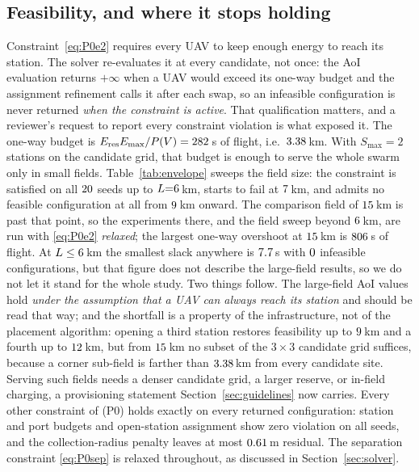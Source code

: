 \subsection{Feasibility, and where it stops holding}
\label{sec:feasible}
\label{sec:reach}

Constraint~\eqref{eq:P0e2} requires every UAV to keep enough energy to reach its
station. The solver re-evaluates it at every candidate, not once: the AoI evaluation
returns $+\infty$ when a UAV would exceed its one-way budget and the assignment
refinement calls it after each swap, so an infeasible configuration is never returned
\emph{when the constraint is active}. That qualification matters, and a reviewer's
request to report every constraint violation is what exposed it. The one-way budget is
$E_{\mathrm{res}}E_{\max}/P(V)=282$\,s of flight, i.e.\ $3.38$\,km. With
$S_{\max}{=}2$ stations on the candidate grid, that budget is enough to serve the whole
swarm only in small fields. Table~\ref{tab:envelope} sweeps the field size: the
constraint is satisfied on all $20$ seeds up to $L{=}6$\,km, starts
to fail at $7$\,km, and admits no feasible configuration at all from
$9$\,km onward. The comparison field of $15$\,km is past that point,
so the experiments there, and the field sweep beyond
$6$\,km, are run with \eqref{eq:P0e2} \emph{relaxed}; the largest one-way
overshoot at $15$\,km is $806$\,s of flight. At $L\le6$\,km the smallest slack anywhere is $7.7$\,s with
$0$ infeasible configurations, but that figure does not describe the
large-field results, so we do not let it stand for the whole study. Two things follow.
The large-field AoI values hold \emph{under the assumption that a UAV can always reach
its station} and should be read that way; and the shortfall is a property of the
infrastructure, not of the placement algorithm: opening a third station restores feasibility up to $9$\,km and a
fourth up to $12$\,km, but from $15$\,km no subset of the
$3\times3$ candidate grid suffices, because a corner sub-field is farther than
$3.38$\,km from every candidate site. Serving such fields needs a denser candidate grid, a larger reserve, or in-field
charging, a provisioning statement Section~\ref{sec:guidelines} now carries. Every
other constraint of (P0) holds exactly on every returned configuration: station and
port budgets and open-station assignment show zero violation on all seeds, and the
collection-radius penalty leaves at most $0.61$\,m residual. The separation constraint \eqref{eq:P0sep} is relaxed throughout, as
discussed in Section~\ref{sec:solver}.

